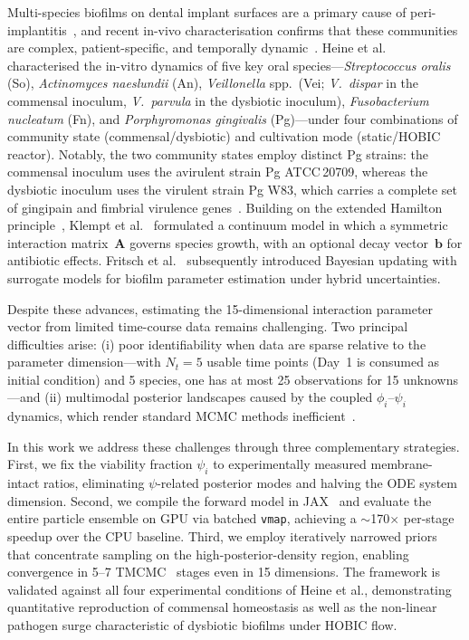 \documentclass[11pt,a4paper]{article}
\begin{document}
Multi-species biofilms on dental implant surfaces are a primary cause of peri-implantitis~\cite{Kolenbrander2010OralMultispecies, Marsh2003Dental}, and recent in-vivo characterisation confirms that these communities are complex, patient-specific, and temporally dynamic~\cite{EarlyImplantBiofilm2024, PeriImplantitisDysbiosis2025}.
Heine et al.~\cite{Heine2025PeriImplant} characterised the in-vitro dynamics of five key oral species---\textit{Streptococcus oralis} (So), \textit{Actinomyces naeslundii} (An), \textit{Veillonella} spp.\ (Vei; \textit{V.~dispar} in the commensal inoculum, \textit{V.~parvula} in the dysbiotic inoculum), \textit{Fusobacterium nucleatum} (Fn), and \textit{Porphyromonas gingivalis} (Pg)---under four combinations of community state (commensal/dysbiotic) and cultivation mode (static/HOBIC reactor).
Notably, the two community states employ distinct Pg strains: the commensal inoculum uses the avirulent strain Pg ATCC\,20709, whereas the dysbiotic inoculum uses the virulent strain Pg W83, which carries a complete set of gingipain and fimbrial virulence genes~\cite{Heine2025PeriImplant}.
Building on the extended Hamilton principle~\cite{JunkerBalzani2021ExtendedHamilton}, Klempt et al.~\cite{Klempt2025ContinuumBiofilm} formulated a continuum model in which a symmetric interaction matrix~$\mathbf{A}$ governs species growth, with an optional decay vector~$\mathbf{b}$ for antibiotic effects.
Fritsch et al.~\cite{Fritsch2025BayesianMicrofilms} subsequently introduced Bayesian updating with surrogate models for biofilm parameter estimation under hybrid uncertainties.

Despite these advances, estimating the 15-dimensional interaction parameter vector from limited time-course data remains challenging.
Two principal difficulties arise: (i) poor identifiability when data are sparse relative to the parameter dimension---with $N_t=5$ usable time points (Day~1 is consumed as initial condition) and 5 species, one has at most 25 observations for 15 unknowns---and (ii) multimodal posterior landscapes caused by the coupled $\phi_i$--$\psi_i$ dynamics, which render standard MCMC methods inefficient~\cite{RobertCasella2004MonteCarlo}.

In this work we address these challenges through three complementary strategies.
First, we fix the viability fraction $\psi_i$ to experimentally measured membrane-intact ratios, eliminating $\psi$-related posterior modes and halving the ODE system dimension.
Second, we compile the forward model in JAX~\cite{jax2018github} and evaluate the entire particle ensemble on GPU via batched \texttt{vmap}, achieving a $\sim$170$\times$ per-stage speedup over the CPU baseline.
Third, we employ iteratively narrowed priors that concentrate sampling on the high-posterior-density region, enabling convergence in 5--7 TMCMC~\cite{ChingChen2007TMCMC, Betz2016TMCMC} stages even in 15 dimensions.
The framework is validated against all four experimental conditions of Heine et al., demonstrating quantitative reproduction of commensal homeostasis as well as the non-linear pathogen surge characteristic of dysbiotic biofilms under HOBIC flow.
\end{document}

